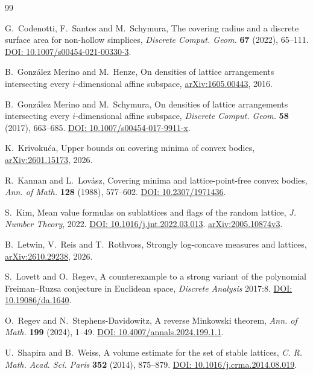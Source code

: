 \documentclass[11pt]{article}
\begin{document}
\small
\begin{thebibliography}{99}
\setlength{\itemsep}{3pt}

G.~Codenotti, F.~Santos and M.~Schymura,
The covering radius and a discrete surface area for non-hollow simplices,
\emph{Discrete Comput. Geom.} \textbf{67} (2022), 65--111.
\href{https://doi.org/10.1007/s00454-021-00330-3}{DOI: 10.1007/s00454-021-00330-3}.

B.~Gonz\'alez Merino and M.~Henze,
On densities of lattice arrangements intersecting every \(i\)-dimensional
affine subspace, \href{https://arxiv.org/abs/1605.00443}{arXiv:1605.00443}, 2016.

B.~Gonz\'alez Merino and M.~Schymura,
On densities of lattice arrangements intersecting every \(i\)-dimensional
affine subspace, \emph{Discrete Comput. Geom.} \textbf{58} (2017),
663--685.
\href{https://doi.org/10.1007/s00454-017-9911-x}{DOI: 10.1007/s00454-017-9911-x}.

K.~Krivoku\'{c}a, Upper bounds on covering minima of convex bodies,
\href{https://arxiv.org/abs/2601.15173}{arXiv:2601.15173}, 2026.

R.~Kannan and L.~Lov\'asz, Covering minima and lattice-point-free convex
bodies, \emph{Ann. of Math.} \textbf{128} (1988), 577--602.
\href{https://doi.org/10.2307/1971436}{DOI: 10.2307/1971436}.

S.~Kim, Mean value formulas on sublattices and flags of the random lattice,
\emph{J. Number Theory}, 2022.
\href{https://doi.org/10.1016/j.jnt.2022.03.013}{DOI: 10.1016/j.jnt.2022.03.013}.
\href{https://arxiv.org/abs/2005.10874}{arXiv:2005.10874v3}.

B.~Letwin, V.~Reis and T.~Rothvoss, Strongly log-concave measures and
lattices, \href{https://arxiv.org/abs/2610.29238}{arXiv:2610.29238}, 2026.

S.~Lovett and O.~Regev, A counterexample to a strong variant of the
polynomial Freiman--Ruzsa conjecture in Euclidean space,
\emph{Discrete Analysis} 2017:8.
\href{https://doi.org/10.19086/da.1640}{DOI: 10.19086/da.1640}.

O.~Regev and N.~Stephens-Davidowitz, A reverse Minkowski theorem,
\emph{Ann. of Math.} \textbf{199} (2024), 1--49.
\href{https://doi.org/10.4007/annals.2024.199.1.1}{DOI: 10.4007/annals.2024.199.1.1}.

U.~Shapira and B.~Weiss, A volume estimate for the set of stable
lattices, \emph{C. R. Math. Acad. Sci. Paris} \textbf{352} (2014),
875--879.
\href{https://doi.org/10.1016/j.crma.2014.08.019}{DOI: 10.1016/j.crma.2014.08.019}.


\end{thebibliography}
\end{document}
